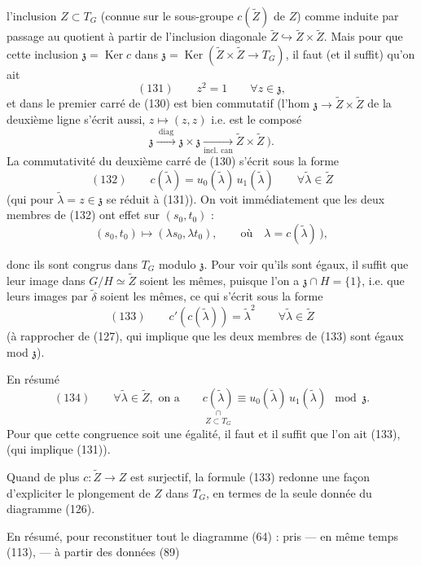 \documentclass[11pt,a4paper]{article}
\begin{document}
  \ill{} \ill{}
l'inclusion $Z\subset T_G$ \ill{} \ill{} (connue sur le sous-groupe $c(\widetilde{Z})$ de $Z$)
comme induite par passage au quotient à partir de l'inclusion diagonale
$\widetilde{Z} \hookrightarrow \widetilde{Z}\times\widetilde{Z}$. Mais pour que cette
inclusion \struck{\ill{}}  $\mathfrak{z} = \operatorname{Ker} c$ dans
$\mathfrak{z} = \operatorname{Ker}(\widetilde{Z}\times\widetilde{Z}\to T_G)$, il faut (et il
suffit) qu'on ait
\[
(131)\qquad z^2 = 1 \qquad \forall z\in\mathfrak{z} ,
\]
et dans le premier carré de (130) est bien commutatif (l'hom $\mathfrak{z}\to\widetilde{Z} \times\widetilde{Z}$ de la deuxième ligne \struck{\ill{}} s'écrit aussi, \struck{\ill{}}
$z\mapsto(z,z)$ i.e. est \struck{\ill{}} le composé
\[
\mathfrak{z} \xrightarrow{\;\text{diag}\;} \mathfrak{z}\times\mathfrak{z}
\xrightarrow[\text{incl. can}]{} \widetilde{Z}\times\widetilde{Z}\ ).
\]
La commutativité du deuxième carré de (130) s'écrit sous la forme
\[
(132)\qquad c(\widetilde{\lambda}) = u_0(\widetilde{\lambda})\,u_1(\widetilde{\lambda})
\qquad \forall\widetilde{\lambda}\in\widetilde{Z}
\]
(qui pour $\widetilde{\lambda} = z\in\mathfrak{z}$ se réduit à (131)). On voit immédiatement que
les deux membres de (132) \struck{\ill{}} ont  effet sur $(s_0,t_0)$ :
\[
(s_0,t_0) \longmapsto (\lambda s_0, \lambda t_0), \qquad \text{où}\quad \lambda =
c(\widetilde{\lambda})\,),
\]


donc ils sont congrus dans $T_G$ modulo $\mathfrak{z}$. Pour voir qu'ils sont égaux, il
 suffit que leur image dans $G/H\simeq\widetilde{Z}$ soient les mêmes,
puisque l'on a $\mathfrak{z}\cap H = \{1\}$, i.e. que leurs images par $\widetilde{\delta}$
soient les mêmes, ce qui s'écrit sous la forme
\[
(133)\qquad c'(c(\widetilde{\lambda})) = \widetilde{\lambda}^2 \qquad
\forall\widetilde{\lambda}\in\widetilde{Z}
\]
(à rapprocher de (127), qui implique que les deux membres de (133) sont égaux mod
$\mathfrak{z}$).

En résumé
\[
(134)\qquad \forall\widetilde{\lambda}\in\widetilde{Z}, \text{ on a}\qquad
\underset{Z\subset T_G}{\underset{\cap}{c(\widetilde{\lambda})}} \equiv
u_0(\widetilde{\lambda})\,u_1(\widetilde{\lambda}) \mod \mathfrak{z} .
\]
Pour que cette congruence soit une égalité, il faut et il suffit que l'on ait (133), (qui
implique (131)).

Quand de plus \struck{\ill{}} $c : \widetilde{Z}\to Z$ est surjectif, la formule (133) redonne
une façon d'expliciter le plongement de $Z$ dans $T_G$, en termes de la seule donnée du
diagramme (126).

En résumé, pour reconstituer tout le diagramme (64) :  pris — en même temps
 (113), — à partir des données (89)
\end{document}
